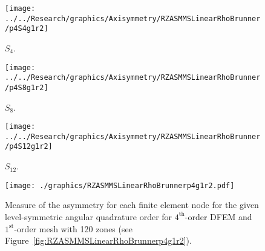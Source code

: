 \documentclass[12pt]{article}
\begin{document}
\begin{sidewaysfigure}[!htb]
\centering
\begin{subfigure}{0.33\textwidth}
\texttt{[image: ../../Research/graphics/Axisymmetry/RZASMMSLinearRhoBrunner/p4S4g1r2]}
\caption{$S_4$.}
\end{subfigure}%
\begin{subfigure}{0.33\textwidth}
\texttt{[image: ../../Research/graphics/Axisymmetry/RZASMMSLinearRhoBrunner/p4S8g1r2]}
\caption{$S_8$.}
\end{subfigure}%
\begin{subfigure}{0.33\textwidth}
\texttt{[image: ../../Research/graphics/Axisymmetry/RZASMMSLinearRhoBrunner/p4S12g1r2]}
\caption{$S_{12}$.}
\end{subfigure}
\caption{Relative asymmetry for $4^\text{st}$-order finite elements on a $1^\text{st}$-order mesh for given order of level-symmetric angular quadrature.}
\label{fig:RZASMMSLinearRhoBrunnerp4g1r2}
\end{sidewaysfigure}

\begin{figure}[!htb]
\centering
\texttt{[image: ./graphics/RZASMMSLinearRhoBrunnerp4g1r2.pdf]}
\caption{Measure of the asymmetry for each finite element node for the given level-symmetric angular quadrature order for $4^\text{th}$-order DFEM and $1^\text{st}$-order mesh with 120 zones (see Figure~\ref{fig:RZASMMSLinearRhoBrunnerp4g1r2}).}
\label{fig:RZASMMSLinearRhoBrunnerp4g1r2Nodes}
\end{figure}
\end{document}
